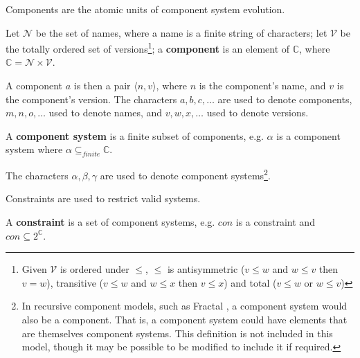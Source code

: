 Components are the atomic units of component system evolution.
\begin{defs}
\label{formal.componentdef}
Let $\mathcal{N}$ be the set of names, where a name is a finite string of characters; 
let $\mathcal{V}$ be the totally ordered set of versions\footnote{Given $\mathcal{V}$ is ordered under 
$\leq$, $\leq$ is antisymmetric ($v \leq w$ and $w \leq v$ then $v = w$), transitive ($v \leq w$ and $w \leq x$ then $v \leq x$) and total ($v \leq w$ or $w \leq v$)}; 
a \textbf{component}
is an element of $\mathbb{C}$, where $\mathbb{C} = \mathcal{N} \times \mathcal{V}$.
\end{defs}
A component $a$ is then a pair $\langle n,v \rangle$, where $n$ is the component's name, and $v$ is the component's version.
The characters  $a,b,c,\ldots$ are used to denote components, $m,n,o,\ldots$ used to denote names, and $v,w,x,\ldots$ used to denote versions.

\begin{defs}
\label{formal.componentsystemdef}
A \textbf{component system} is a finite subset of components, e.g. $\alpha$ is a component system where $\alpha \subseteq_{finite} \mathbb{C}$. 
\end{defs}
The characters $\alpha,\beta,\gamma$ are used to denote component systems\footnote{In recursive component models, such as Fractal \citep{Quma2006}, 
a component system would also be a component.
That is, a component system could have elements that are themselves component systems.
This definition is not included in this model, though it may be possible to be modified to include it if required.}.

Constraints are used to restrict valid systems.
\begin{defs}
\label{formal.constraintdefs}
A \textbf{constraint} is a set of component systems, e.g. $con$ is a constraint and $con \subseteq 2^{\mathbb{C}}$.
\end{defs}

